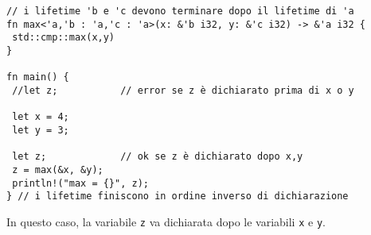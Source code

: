 \documentclass{article}
\begin{document}
\begin{tcolorbox}
\begin{verbatim}
// i lifetime 'b e 'c devono terminare dopo il lifetime di 'a
fn max<'a,'b : 'a,'c : 'a>(x: &'b i32, y: &'c i32) -> &'a i32 {
 std::cmp::max(x,y)
}

fn main() {
 //let z;           // error se z è dichiarato prima di x o y

 let x = 4;
 let y = 3;

 let z;             // ok se z è dichiarato dopo x,y
 z = max(&x, &y);
 println!("max = {}", z);
} // i lifetime finiscono in ordine inverso di dichiarazione
\end{verbatim}
\end{tcolorbox}
In questo caso, la variabile \texttt{z} va dichiarata dopo le variabili \texttt{x} e \texttt{y}.
\end{document}

